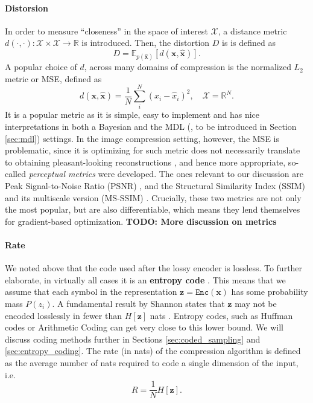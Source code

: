 \documentclass{article}
\renewcommand{\vec}[1]{\mathbf{#1}}
\newcommand{\Enc}{\mathtt{Enc}}
\newcommand{\Exp}{\mathbb{E}}
\newcommand{\ImSpace}{\mathcal{X}}
\newcommand{\Reals}{\mathbb{R}}
\begin{document}
\paragraph{Distorsion}
In order to measure ``closeness'' in the space of interest $\ImSpace$,
a distance metric $d(\cdot, \cdot): \ImSpace
\times \ImSpace \rightarrow \Reals$ is introduced. Then, the distortion $D$ is 
is defined as
\[
  D = \Exp_{p(\vec{\hat{x}})}[d(\vec{x}, \vec{\hat{x}})].
\]
A popular choice of $d$, across many domains of compression is the normalized $L_2$ metric
or MSE, defined as
\[
  d(\vec{x}, \vec{\hat{x}}) = \frac{1}{N} \sum_{i}^N (x_i - \hat{x}_i)^2, \quad
  \ImSpace = \Reals^N.
\]
It is a popular metric as it is simple, easy to implement and has nice
interpretations in both a Bayesian \cite{bishop2013pattern} and the MDL
(\cite{hinton1993keeping}, to be introduced in Section \ref{sec:mdl}) settings.
In the image compression setting, however, the MSE is problematic, since it is
optimizing for such metric does not necessarily translate to obtaining pleasant-looking
reconstructions \cite{zhao2015loss}, and hence more appropriate, so-called \textit{perceptual
  metrics} were developed. The ones relevant to our discussion are Peak
Signal-to-Noise Ratio (PSNR) \cite{psnr}, \cite{gupta2011modified} and the
Structural Similarity Index (SSIM) \cite{wang2004image} and its multiscale
version (MS-SSIM) \cite{msssim}. Crucially, these
two metrics are not only the most popular, but are also differentiable, which
means they lend themselves for gradient-based optimization.
\textbf{TODO: More discussion on metrics}

\paragraph{Rate}
We noted above that the code used after the lossy encoder is lossless. To
further elaborate, in virtually all cases it is an \textbf{entropy code}
\cite{goyal2001theoretical}. This means that we assume that each symbol
in the representation $\vec{z} = \Enc(\vec{x})$ has some probability mass
$P(z_i)$. A fundamental result by Shannon states that $\vec{z}$ may not be
encoded losslessly in fewer than $H[\vec{z}]$ nats
\cite{shannon1998mathematical}. Entropy codes, such as Huffman codes
\cite{huffman1952method} or Arithmetic Coding \cite{rissanen1981universal} can
get very close to this lower bound. We will discuss coding methods further in Sections
\ref{sec:coded_sampling} and \ref{sec:entropy_coding}. The rate (in nats) of the compression algorithm is defined
as the average number of nats required to code a single dimension of the input, i.e.
\[
  R = \frac{1}{N} H[\vec{z}].
\]
\end{document}
